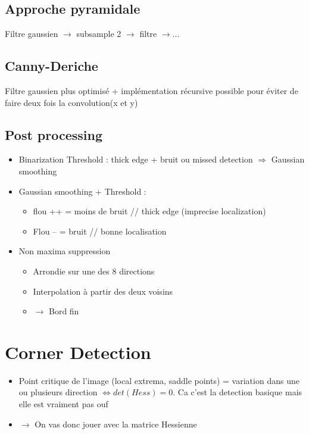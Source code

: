 \documentclass{article}
\theoremstyle{plain}%
\theoremstyle{definition}
\theoremstyle{remark}
\begin{document}
\subsection{Approche pyramidale}
Filtre gaussien $\rightarrow$ subsample 2 $\rightarrow$ filtre $\rightarrow$...

\subsection{Canny-Deriche}
Filtre gaussien plus optimisé + implémentation récursive possible pour éviter de faire deux fois la convolution(x et y)

\subsection{Post processing}
\begin{itemize}
    \item Binarization Threshold : thick edge + bruit ou missed detection $\Rightarrow$ Gaussian smoothing 
    \item Gaussian smoothing + Threshold : \begin{itemize}
        \item flou ++ = moins de bruit // thick edge (imprecise localization)
        \item Flou -- = bruit // bonne localisation
    \end{itemize}
    \item Non maxima suppression \begin{itemize}
        \item Arrondie sur une des 8 directions 
        \item Interpolation à partir des deux voisins 
        \item $\rightarrow$ Bord fin 
    \end{itemize}
\end{itemize}


\section{Corner Detection}
\begin{itemize}
    \item Point critique de l'image (local extrema, saddle points) = variation dans une ou plusieurs direction $ \Leftrightarrow det(Hess) = 0 $. Ca c'est la detection basique mais elle est vraiment pas ouf
    \item $\rightarrow$ On vas donc jouer avec la matrice Hessienne
\end{itemize}
\end{document}

